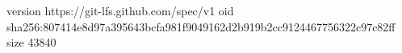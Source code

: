 version https://git-lfs.github.com/spec/v1
oid sha256:807414e8d97a395643bcfa981f9049162d2b919b2cc9124467756322c97c82ff
size 43840
